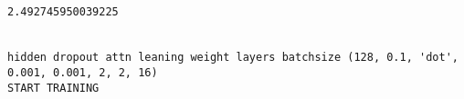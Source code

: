 \documentclass[11pt]{article}
\begin{document}
    \begin{center}
    \end{center}
    { \hspace*{\fill} \\}
    
    \begin{center}
    \end{center}
    { \hspace*{\fill} \\}
    
    \begin{center}
    \end{center}
    { \hspace*{\fill} \\}
    
    \begin{center}
    \end{center}
    { \hspace*{\fill} \\}
    
    \begin{Verbatim}[commandchars=\\\{\}]
2.492745950039225


hidden dropout attn leaning weight layers batchsize (128, 0.1, 'dot', 0.001, 0.001, 2, 2, 16)
START TRAINING



    \end{Verbatim}

    \begin{center}
    \end{center}
    { \hspace*{\fill} \\}
    
    \begin{center}
    \end{center}
    { \hspace*{\fill} \\}
    
    \begin{center}
    \end{center}
    { \hspace*{\fill} \\}
    
\end{document}

